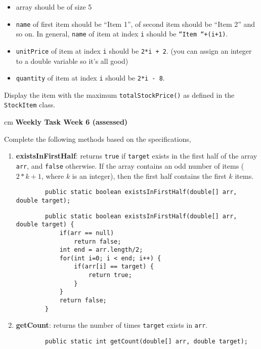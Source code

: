 \begin{questions}
\begin{itemize}
\item array should be of size 5
\item \texttt{name} of first item should be ``Item 1'', of second item should be ``Item 2'' and so on. In general, \texttt{name} of item at index \texttt{i} should be \texttt{``Item ``+(i+1)}.
\item \texttt{unitPrice} of item at index \texttt{i} should be \texttt{2*i + 2}. (you can assign an integer to a double variable so it's all good)
\item \texttt{quantity} of item at index \texttt{i} should be \texttt{2*i - 8}.
\end{itemize}

Display the item with the maximum \texttt{totalStockPrice()} as defined in the \texttt{StockItem} class.

 cm \question \textbf{Weekly Task Week 6 (assessed)} \vskip 0.5cm

Complete the following methods based on the specifications,

\begin{enumerate}
	\item \textbf{existsInFirstHalf}: returns \texttt{true} if \texttt{target} exists in the first half of the array \texttt{arr}, and \texttt{false} otherwise. If the array contains an odd number of items ($2*k + 1$, where $k$ is an integer), then the first half contains the first $k$ items.
	
	\begin{lstlisting}
		public static boolean existsInFirstHalf(double[] arr, double target);		
	\end{lstlisting}
	
	\ifprintanswers
	\begin{lstlisting}
		public static boolean existsInFirstHalf(double[] arr, double target) {
			if(arr == null)
				return false;
			int end = arr.length/2;	
			for(int i=0; i < end; i++) {
				if(arr[i] == target) {
					return true;
				}
			}
			return false;
		}
	\end{lstlisting}
	\else
	\fi
	
	\item \textbf{getCount}: returns the number of times \texttt{target} exists in \texttt{arr}.
	
	\begin{lstlisting}
		public static int getCount(double[] arr, double target);		
	\end{lstlisting}
	

\end{enumerate}
\end{questions}
